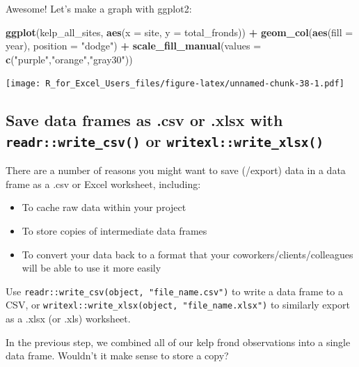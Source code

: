 \documentclass[]{book}
\newenvironment{Shaded}{\begin{snugshade}}{\end{snugshade}}
\newcommand{\DataTypeTok}[1]{\textcolor[rgb]{0.13,0.29,0.53}{#1}}
\newcommand{\KeywordTok}[1]{\textcolor[rgb]{0.13,0.29,0.53}{\textbf{#1}}}
\newcommand{\NormalTok}[1]{#1}
\newcommand{\OperatorTok}[1]{\textcolor[rgb]{0.81,0.36,0.00}{\textbf{#1}}}
\newcommand{\StringTok}[1]{\textcolor[rgb]{0.31,0.60,0.02}{#1}}
\providecommand{\tightlist}{%
  \setlength{\itemsep}{0pt}\setlength{\parskip}{0pt}}
\begin{document}
Awesome! Let's make a graph with ggplot2:

\begin{Shaded}
\begin{Highlighting}[]
\KeywordTok{ggplot}\NormalTok{(kelp_all_sites, }\KeywordTok{aes}\NormalTok{(}\DataTypeTok{x =}\NormalTok{ site, }\DataTypeTok{y =}\NormalTok{ total_fronds)) }\OperatorTok{+}
\StringTok{  }\KeywordTok{geom_col}\NormalTok{(}\KeywordTok{aes}\NormalTok{(}\DataTypeTok{fill =}\NormalTok{ year), }\DataTypeTok{position =} \StringTok{"dodge"}\NormalTok{) }\OperatorTok{+}
\StringTok{  }\KeywordTok{scale_fill_manual}\NormalTok{(}\DataTypeTok{values =} \KeywordTok{c}\NormalTok{(}\StringTok{"purple"}\NormalTok{,}\StringTok{"orange"}\NormalTok{,}\StringTok{"gray30"}\NormalTok{))}
\end{Highlighting}
\end{Shaded}

\texttt{[image: R\_for\_Excel\_Users\_files/figure-latex/unnamed-chunk-38-1.pdf]}

\hypertarget{save-data-frames-as-.csv-or-.xlsx-with-readrwrite_csv-or-writexlwrite_xlsx}{%
\subsection{\texorpdfstring{Save data frames as .csv or .xlsx with \texttt{readr::write\_csv()} or \texttt{writexl::write\_xlsx()}}{Save data frames as .csv or .xlsx with readr::write\_csv() or writexl::write\_xlsx()}}\label{save-data-frames-as-.csv-or-.xlsx-with-readrwrite_csv-or-writexlwrite_xlsx}}

There are a number of reasons you might want to save (/export) data in a data frame as a .csv or Excel worksheet, including:

\begin{itemize}
\tightlist
\item
  To cache raw data within your project
\item
  To store copies of intermediate data frames
\item
  To convert your data back to a format that your coworkers/clients/colleagues will be able to use it more easily
\end{itemize}

Use \texttt{readr::write\_csv(object,\ "file\_name.csv")} to write a data frame to a CSV, or \texttt{writexl::write\_xlsx(object,\ "file\_name.xlsx")} to similarly export as a .xlsx (or .xls) worksheet.

In the previous step, we combined all of our kelp frond observations into a single data frame. Wouldn't it make sense to store a copy?
\end{document}
